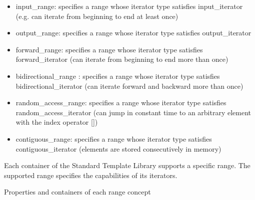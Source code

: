 \begin{itemize}
\item 
input\_range: specifies a range whose iterator type satisfies input\_iterator (e.g. can iterate from beginning to end at least once)

\item 
output\_range: specifies a range whose iterator type satisfies output\_iterator

\item 
forward\_range: specifies a range whose iterator type satisfies forward\_iterator (can iterate from beginning to end more than once)

\item 
bidirectional\_range : specifies a range whose iterator type satisfies bidirectional\_iterator (can iterate forward and backward more than once)

\item 
random\_access\_range: specifies a range whose iterator type satisfies random\_access\_iterator (can jump in constant time to an arbitrary element with the index operator [])

\item 
contiguous\_range: specifies a range whose iterator type satisfies contiguous\_iterator (elements are stored consecutively in memory)
\end{itemize}

Each container of the Standard Template Library supports a specific range. The supported range specifies the capabilities of its iterators.

\begin{center}
Properties and containers of each range concept
\end{center}

